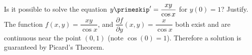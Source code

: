 {Is it possible to solve the equation $y\primeskip' = \dfrac{xy}{\cos x}$ for $y(0) = 1$?
Justify.}
{The function $f(x,y) = \dfrac{xy}{\cos x}$, and $\dfrac{\partial f}{\partial y}(x,y) = \dfrac{x}{\cos x}$ both exist and are continuous near the point $(0,1)$ (note $\cos(0)=1$). Therefore a solution is guaranteed by Picard's Theorem.}